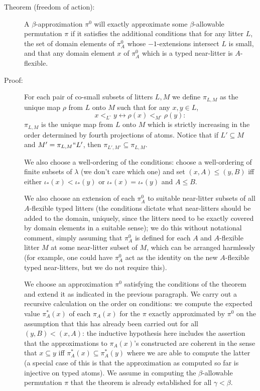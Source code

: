 \documentclass[112pt]{article}
\begin{document}
\begin{description}
\item[Theorem (freedom of action):]  A $\beta$-approximation $\pi^0$ will exactly approximate some $\beta$-allowable permutation $\pi$ if it satisfies the additional conditions that for any litter $L$, the set of domain elements of $\pi^0_A$ whose $-1$-extensions intersect $L$ is small,
and that any domain element $x$ of $\pi^0_A$ which is a typed near-litter is $A$-flexible.

\item[Proof:]   For each pair of co-small subsets of litters $L,M$ we define $\pi_{L,M}$ as the unique map $\rho$ from $L$ onto $M$ such
that for any $x,y \in L$, $$x <_{L^{\circ}} y \leftrightarrow \rho(x) <_{M^\circ} \rho(y):$$  $\pi_{L,M}$ is the unique map from $L$ onto $M$ which is strictly increasing in the order determined by fourth projections of atoms.  Notice that if $L' \subseteq M$ and $M' = \pi_{L,M}``L'$, then $\pi_{L',M'} \subseteq \pi_{L,M}$.

We also choose a well-ordering of the conditions:  choose a well-ordering of finite subsets of $\lambda$ (we don't care which one) and
set $(x,A) \leq (y,B)$ iff either $\iota_*(x) < \iota_*(y)$ or $\iota_*(x) = \iota_*(y)$ and $A \leq B$. 

We also choose an extension of each  $\pi^0_A$ to suitable near-litter subsets of all $A$-flexible typed litters (the conditions dictate what near-litters should be added to the domain, uniquely, since the litters need to be exactly covered by domain elements in a suitable sense);  we do this without notational comment, simply assuming that $\pi^0_A$ is defined for each $A$ and $A$-flexible litter $M$ at some near-litter subset of $M$, which can be arranged harmlessly
(for example, one could have $\pi^0_A$ act as the identity on the new $A$-flexible typed near-litters, but we do not require this).

We choose an approximation $\pi^0$ satisfying the conditions of the theorem and extend it as indicated in the previous paragraph.  We carry out a recursive calculation on the order on conditions:
we compute the expected value $\pi_A^*(x)$ of each $\pi_A(x)$ for the $\pi$ exactly approximated by $\pi^0$ on the assumption that this has already been carried out for all $(y,B)< (x,A)$:  the inductive hypothesis here includes the assertion that the approximations to $\pi_A(x)$'s constructed are coherent in the sense that $x \subseteq y$ iff
$\pi^*_A(x) \subseteq \pi^*_A(y)$ where we are able to compute the latter (a special case of this is that the approximation as computed so far is injective on typed atoms).  We assume in computing the $\beta$-allowable permutation $\pi$ that the theorem is already established for all $\gamma<\beta$.


\end{description}
\end{document}
